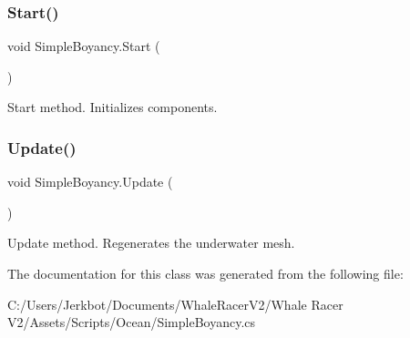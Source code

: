 \subsubsection{\texorpdfstring{Start()}{Start()}}
{\footnotesize\ttfamily void Simple\+Boyancy.\+Start (\begin{DoxyParamCaption}{ }\end{DoxyParamCaption})\hspace{0.3cm}{\ttfamily [private]}}



Start method. Initializes components. 

\mbox{\label{class_simple_boyancy_ad1e88e01095b9f9ca6b3b58ece3c7644}} 
\subsubsection{\texorpdfstring{Update()}{Update()}}
{\footnotesize\ttfamily void Simple\+Boyancy.\+Update (\begin{DoxyParamCaption}{ }\end{DoxyParamCaption})\hspace{0.3cm}{\ttfamily [private]}}



Update method. Regenerates the underwater mesh. 



The documentation for this class was generated from the following file\+:\begin{DoxyCompactItemize}
\item 
C\+:/\+Users/\+Jerkbot/\+Documents/\+Whale\+Racer\+V2/\+Whale Racer V2/\+Assets/\+Scripts/\+Ocean/Simple\+Boyancy.\+cs\end{DoxyCompactItemize}
